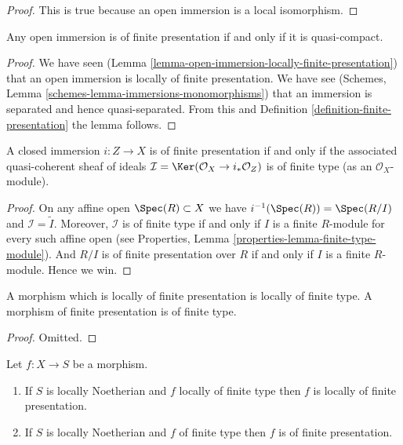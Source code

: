 \begin{proof}
This is true because an open immersion is a local isomorphism.
\end{proof}

\begin{lemma}
\label{lemma-quasi-compact-open-immersion-finite-presentation}
Any open immersion is of finite presentation if and only if
it is quasi-compact.
\end{lemma}

\begin{proof}
We have seen (Lemma \ref{lemma-open-immersion-locally-finite-presentation})
that an open immersion is locally of finite presentation.
We have see (Schemes, Lemma \ref{schemes-lemma-immersions-monomorphisms})
that an immersion is separated and hence quasi-separated. From this
and Definition \ref{definition-finite-presentation} the lemma follows.
\end{proof}

\begin{lemma}
\label{lemma-closed-immersion-finite-presentation}
A closed immersion $i : Z \to X$ is of finite presentation if and only if
the associated quasi-coherent sheaf of ideals
$\mathcal{I} = \Ker(\mathcal{O}_X \to i_*\mathcal{O}_Z)$
is of finite type (as an $\mathcal{O}_X$-module).
\end{lemma}

\begin{proof}
On any affine open $\Spec(R) \subset X$ we have
$i^{-1}(\Spec(R)) = \Spec(R/I)$ and
$\mathcal{I} = \widetilde{I}$. Moreover, $\mathcal{I}$
is of finite type if and only if $I$ is a finite $R$-module
for every such affine open (see
Properties, Lemma \ref{properties-lemma-finite-type-module}).
And $R/I$ is of finite presentation
over $R$ if and only if $I$ is a finite $R$-module. Hence we win.
\end{proof}

\begin{lemma}
\label{lemma-finite-presentation-finite-type}
A morphism which is locally of finite presentation is locally of finite type.
A morphism of finite presentation is of finite type.
\end{lemma}

\begin{proof}
Omitted.
\end{proof}

\begin{lemma}
\label{lemma-noetherian-finite-type-finite-presentation}
Let $f : X \to S$ be a morphism.
\begin{enumerate}
\item If $S$ is locally Noetherian and $f$ locally of finite type
then $f$ is locally of finite presentation.
\item If $S$ is locally Noetherian and $f$ of finite type
then $f$ is of finite presentation.
\end{enumerate}
\end{lemma}

